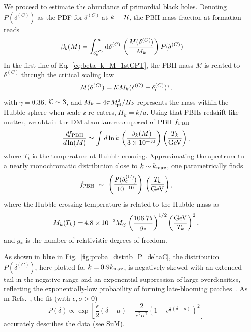 \documentclass[twocolumn,superscriptaddress,aps,preprintnumbers,amsmath,amssymb,prl,footinbib]{revtex4-2}
\begin{document}
We proceed to estimate the abundance of primordial black holes. Denoting $P(\delta^{(C)})$ as the PDF for $\delta^{(C)}$ at $k={\cal H}$, the PBH mass fraction at formation reads
\begin{align}
\label{eq:beta_k_M_1stOPT}
\beta_k(M) &= \int_{\delta^{(C)}_c}^{\infty}
{\rm d}\delta^{(C)} \,
\left (\frac{M(\delta^{(C)})}{M_k} \right )
P(\delta^{(C)}) .
\end{align}
In the first line of Eq.~\eqref{eq:beta_k_M_1stOPT}, the PBH mass $M$ is related to $\delta^{(C)}$ through the critical scaling law \cite{Choptuik:1992jv,Evans:1994pj,Niemeyer:1997mt,Musco:2012au}
\begin{equation}
\label{eq:choptuik_law}
M(\delta^{(C)}) = {\cal K} M_k (\delta^{(C)} - \delta_c^{(C)})^\gamma,
\end{equation}
with $\gamma = 0.36$, ${\cal K} \sim 3$, and
$M_k = 4\pi M_{\rm pl}^2/H_k$
represents the mass within the Hubble sphere when scale $k$ re-enters, $H_k=k/a$.
Using that PBHs redshift like matter, we obtain the DM abundance composed of PBH $f_{\rm PBH}$
\begin{equation}
\frac{df_{\rm PBH}}{d\ln(M)} \simeq \int d\ln{k}\,\left(\frac{\beta_k(M)}{3 \times 10^{-10}}\right)\left(\frac{T_k}{\rm GeV}\right),
\end{equation}
where $T_k$ is the temperature at Hubble crossing.
Approximating the spectrum to a nearly monochromatic distribution close to $k \sim k_{\rm max}$, one parametrically finds
\begin{equation}
f_{\rm PBH} ~\sim~
\left (\frac{P(\delta_c^{(C)})}{10^{-10}}\right )\,
\left (\frac{T_{k}}{\rm GeV} \right ),
\end{equation}
where the Hubble crossing temperature is related to the Hubble mass as
\begin{equation}
M_k(T_k)
= 4.8\times 10^{-2} M_\odot
\left(\frac{106.75}{g_*} \right)^{1/2} \left( \frac{\rm GeV}{T_k} \right)^{2},
\end{equation}
and $g_*$ is the number of relativistic degrees of freedom.

As shown in blue in Fig.~\ref{fig:proba_distrib_P_deltaC}, the distribution
$P(\delta^{(C)})$, here plotted for $k=0.9k_{\rm max}$, is negatively skewed with an extended tail in the negative range and an exponential suppression of large overdensities, reflecting the exponentially-low probability of forming late-blooming patches~\cite{Gouttenoire:2023naa}. As in Refs.~\cite{Tomberg:2023kli,Lewicki:2024ghw}, the fit (with $\epsilon, \sigma > 0$)
\begin{equation}
\label{eq:fit_function}
P(\delta) \propto \exp\!\left[\frac{\epsilon}{2}(\delta-\mu) - \frac{2}{\epsilon^2\sigma^2}\left(1 - e^{\frac{\epsilon}{2}(\delta-\mu)}\right)^2\right]
\end{equation}
accurately describes the data (see SuM).
\end{document}
